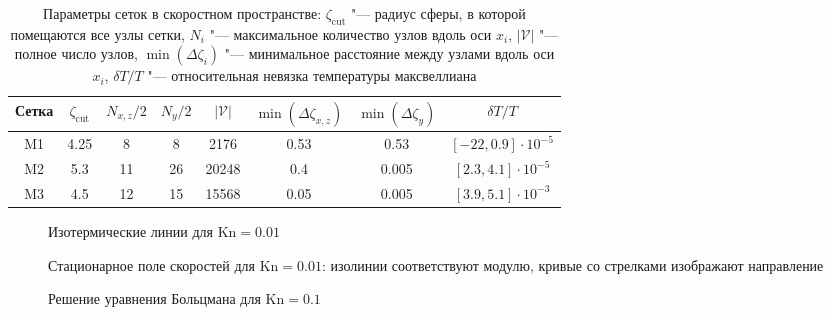 \documentclass[
aps,%
12pt,%
final,%
notitlepage,%
oneside,%
onecolumn,%
nobibnotes,%
nofootinbib,%
superscriptaddress,%
noshowpacs,%
showkeys,%
tightenlines,%
centertags]%
{revtex4}
\newcommand{\Kn}{\mathrm{Kn}}
\begin{document}
\setlength{\tabcolsep}{10pt}
\begin{table}
    \caption{Параметры сеток в скоростном пространстве:
        \(\zeta_{\mathrm{cut}}\) "--- радиус сферы, в которой помещаются все узлы сетки,
        \(N_i\) "--- максимальное количество узлов вдоль оси \(x_i\),
        \(|\mathcal{V}|\) "--- полное число узлов,
        \(\min(\Delta\zeta_i)\) "--- минимальное расстояние между узлами вдоль оси \(x_i\),
        \(\delta T/T\) "--- относительная невязка температуры максвеллиана}
    \label{table:velocity_grids}
    \centering
    \begin{tabular}{cccccccc}
        Сетка & \(\zeta_{\mathrm{cut}}\) & \(N_{x,z}/2\) & \(N_y/2\) & \(|\mathcal{V}|\)
            & \(\min(\Delta\zeta_{x,z})\) & \(\min(\Delta\zeta_y)\) & \(\delta T/T\) \\\hline
        M1 & 4.25 & 8  & 8  & 2176  & 0.53 & 0.53  & \([-22,0.9]\cdot10^{-5}\) \\
        M2 & 5.3  & 11 & 26 & 20248 & 0.4  & 0.005 & \([2.3,4.1]\cdot10^{-5}\) \\
        M3 & 4.5  & 12 & 15 & 15568 & 0.05 & 0.005 & \([3.9,5.1]\cdot10^{-3}\) \\
    \end{tabular}
\end{table}

\begin{figure}
    \centering
    \caption{Изотермические линии для \(\Kn=0.01\)}
    \label{fig:kn0.01:temp}
\end{figure}

\begin{figure}
    \centering
    \caption{Стационарное поле скоростей для \(\Kn=0.01\):
        изолинии соответствуют модулю, кривые со стрелками изображают направление}
    \label{fig:kn0.01:flow}
\end{figure}

\begin{figure}
    \centering
    \caption{Решение уравнения Больцмана для \(\Kn=0.1\)}
    \label{fig:kn0.1}
\end{figure}
\end{document}
